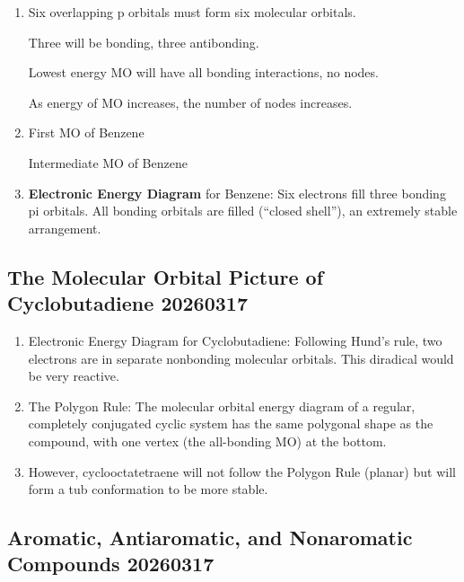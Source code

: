 \begin{enumerate}
    \item Six overlapping p orbitals must form six molecular orbitals.
    
    Three will be bonding, three antibonding.
    
    Lowest energy MO will have all bonding interactions, no nodes.
    
    As energy of MO increases, the number of nodes increases.
    \item First MO of Benzene
    
    Intermediate MO of Benzene

    \item \textbf{Electronic Energy Diagram} for Benzene: Six electrons fill three bonding pi orbitals. All bonding orbitals are filled (“closed shell”), an extremely stable arrangement.
\end{enumerate}

\subsection{The Molecular Orbital Picture of Cyclobutadiene 20260317}

\begin{enumerate}
    \item Electronic Energy Diagram for Cyclobutadiene: Following Hund’s rule, two electrons are in separate nonbonding molecular orbitals. This diradical would be very reactive.
    \item The Polygon Rule: The molecular orbital energy diagram of a regular, completely conjugated cyclic system has the same polygonal shape as the compound, with one vertex (the all-bonding MO) at the bottom.
    \item However, cyclooctatetraene will not follow the Polygon Rule (planar) but will form a tub conformation to be more stable.
\end{enumerate}

\subsection{Aromatic, Antiaromatic, and Nonaromatic Compounds 20260317}

